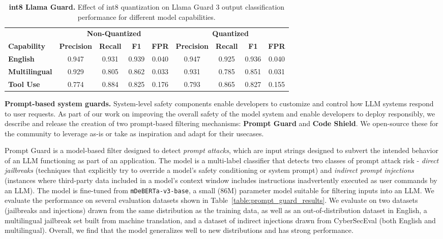\documentclass[dvipsnames]{fairmeta}
\begin{document}
\begin{table}
\centering
    \begin{tabular}{lcccccccc}
    \toprule
   & \multicolumn{4}{c}{\textbf{Non-Quantized}} & \multicolumn{4}{c}{\textbf{Quantized}} \\
      \textbf{Capability} & \textbf{Precision} & \textbf{Recall} & \textbf{F1} & \textbf{FPR} & \textbf{Precision} & \textbf{Recall} & \textbf{F1} & \textbf{FPR} \\
    \midrule
    \textbf{English} & 0.947 & 0.931 & 0.939 & 0.040 & 0.947 & 0.925 & 0.936 & 0.040 \\
    \textbf{Multilingual} & 0.929 & 0.805 & 0.862 & 0.033 & 0.931 & 0.785 & 0.851 & 0.031 \\
    \textbf{Tool Use} & 0.774 & 0.884 & 0.825 & 0.176 & 0.793 & 0.865 & 0.827 & 0.155 \\
    \bottomrule
    \end{tabular}
    \caption{\textbf{int8 Llama Guard.} Effect of int8 quantization on Llama Guard 3 output classification performance for different model capabilities.}
    \label{table:quantization_with_sls}
\end{table}

\textbf{Prompt-based system guards.}
System-level safety components enable developers to customize and control how LLM systems respond to user requests. 
As part of our work on improving the overall safety of the model system and enable developers to deploy responsibly, we describe and release the creation of two prompt-based filtering mechanisms: \textbf{Prompt Guard} and \textbf{Code Shield}.
We open-source these for the community to leverage as-is or take as inspiration and adapt for their usecases. 

Prompt Guard is a model-based filter designed to detect \textit{prompt attacks}, which are input strings designed to subvert the intended behavior of an LLM functioning as part of an application. The model is a multi-label classifier that detects two classes of prompt attack risk - \textit{direct jailbreaks} (techniques that explicitly try to override a model's safety conditioning or system prompt) and \textit{indirect prompt injections} (instances where third-party data included in a model's context window includes instructions inadvertently executed as user commands by an LLM). The model is fine-tuned from \texttt{mDeBERTa-v3-base}, a small (86M) parameter model suitable for filtering inputs into an LLM. We evaluate the performance on several evaluation datasets shown in Table~\ref{table:prompt_guard_results}. We evaluate on two datasets (jailbreaks and injections) drawn from the same distribution as the training data, as well as an out-of-distribution dataset in English, a multilingual jailbreak set built from machine translation, and a dataset of indirect injections drawn from CyberSecEval (both English and multilingual). Overall, we find that the model generalizes well to new distributions and has strong performance. 
\end{document}
